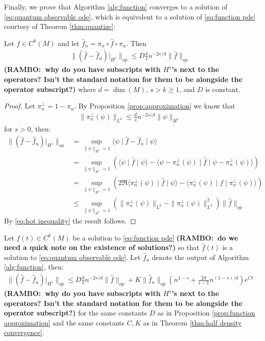 \documentclass[final,leqno]{siamltex1213}
\newcommand{\ram}[1]{{\normalsize{\textbf{({\color{red}RAMBO:\ }#1)}}}}
\begin{document}
Finally, we prove that Algorithm \ref{alg:function} converges to a solution of \eqref{eq:quantum observable ode}, which is equivalent to a solution of \eqref{eq:function pde} courtesy of Theorem \ref{thm:quantize}:

\begin{proposition} \label{prop:function approximation}
	Let $f \in C^{k}(M)$ and let $\hat{f}_{n} = \pi_{n} \circ \hat{f} \circ \pi_{n}$.  Then
	\begin{align}
		\| ( \hat{f} - \hat{f}_{n} )|_{H^{s}} \|_{op} \leq D \frac{d}{s} n^{-2s/d} \| \hat{f} \|_{op}
	\end{align}
	\ram{why do you have subscripts with $H^{s}$'s next to the operators? Isn't the standard notation for them to be alongside the operator subscript?}
	where $d= \dim(M)$, $s > k \geq 1$, and $D$ is constant.
\end{proposition}
\begin{proof}
	Let $\pi_{n}^{\perp} = 1 - \pi_{n}$.  By Proposition \ref{prop:approximation} we know that
	\begin{align}
		\| \pi_{n}^{\perp}(\psi) \|_{L^{2}} \leq \frac{d}{s} n^{-2s/d} \| \psi \|_{H^{s}} \label{eq:hot inequality}
	\end{align}
	for $s>0$, then:
	\begin{align}
		\| (\hat{f} - \hat{f}_{n})|_{H^{s}} \|_{op} &= \sup_{\| \psi \|_{H^{s}}=1} \langle \psi \mid \hat{f} - \hat{f}_{n} \mid \psi \rangle \\
			&= \sup_{\| \psi \|_{H^{s}}=1} \left( \langle \psi \mid \hat{f}  \mid \psi \rangle - \langle \psi - \pi_{n}^{\perp}(\psi) \mid \hat{f} \mid \psi - \pi_{n}^{\perp}(\psi) \rangle \right) \\
			&= \sup_{\| \psi \|_{H^{s}}=1} \left( 2 \Re \langle \pi_{n}^{\perp}(\psi) \mid \hat{f} \mid \psi \rangle - \langle \pi_{n}^{\perp}(\psi) \mid \hat{f} \mid \pi_{n}^{\perp}(\psi) \rangle \right) \\
			&\leq \sup_{\| \psi \|_{H^{s}}=1}  ( \| \pi_{n}^{\perp}(\psi) \|_{L^{2}}- \| \pi_{n}^{\perp}(\psi) \|_{L^{2}}^{2} ) \| \hat{f} \|_{op} 
	\end{align}
	By \eqref{eq:hot inequality} the result follows.
\end{proof}

\begin{theorem} \label{thm:function convergence}
	Let $f(t) \in C^{k}(M)$ be a solution to \eqref{eq:function pde} \ram{do we need a quick note on the existence of solutions?} so that $\hat{f}(t)$ is a solution to \eqref{eq:quantum observable ode}.
	Let $\hat{f}_{n}$ denote the output of Algorithm \ref{alg:function}, then:
	\begin{align}
		\| ( \hat{f} - \hat{f}_{n})|_{H^{s}} \|_{op} \leq D \frac{d}{s} n^{-2s/d} \| \hat{f} \|_{op}+  K \| \hat{f}_{n} \|_{op} \left( n^{1-s} + \frac{2d}{s -1} n^{(1-s)/d} \right) e^{Ct}
	\end{align}
	\ram{why do you have subscripts with $H^{s}$'s next to the operators? Isn't the standard notation for them to be alongside the operator subscript?}
	for the same constants $D$ as in Proposition \ref{prop:function approximation} and the same constants $C,K$ as in Theorem \ref{thm:half density convergence}.
\end{theorem}
\end{document}
